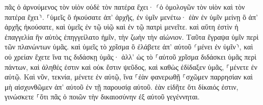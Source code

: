 \documentclass{openreader}
\begin{document}
πᾶς ὁ ἀρνούμενος τὸν υἱὸν οὐδὲ τὸν πατέρα ἔχει· ⸂ὁ ὁμολογῶν τὸν υἱὸν καὶ τὸν πατέρα ἔχει⸃. 
⸀ὑμεῖς ὃ ἠκούσατε ἀπ’ ἀρχῆς, ἐν ὑμῖν μενέτω· ἐὰν ἐν ὑμῖν μείνῃ ὃ ἀπ’ ἀρχῆς ἠκούσατε, καὶ ὑμεῖς ἐν τῷ υἱῷ καὶ ἐν τῷ πατρὶ μενεῖτε. 
καὶ αὕτη ἐστὶν ἡ ἐπαγγελία ἣν αὐτὸς ἐπηγγείλατο ἡμῖν, τὴν ζωὴν τὴν αἰώνιον. 
Ταῦτα ἔγραψα ὑμῖν περὶ τῶν πλανώντων ὑμᾶς. 
καὶ ὑμεῖς τὸ χρῖσμα ὃ ἐλάβετε ἀπ’ αὐτοῦ ⸂μένει ἐν ὑμῖν⸃, καὶ οὐ χρείαν ἔχετε ἵνα τις διδάσκῃ ὑμᾶς· ἀλλ’ ὡς τὸ ⸀αὐτοῦ χρῖσμα διδάσκει ὑμᾶς περὶ πάντων, καὶ ἀληθές ἐστιν καὶ οὐκ ἔστιν ψεῦδος, καὶ καθὼς ἐδίδαξεν ὑμᾶς, ⸀μένετε ἐν αὐτῷ. 
Καὶ νῦν, τεκνία, μένετε ἐν αὐτῷ, ἵνα ⸀ἐὰν φανερωθῇ ⸀σχῶμεν παρρησίαν καὶ μὴ αἰσχυνθῶμεν ἀπ’ αὐτοῦ ἐν τῇ παρουσίᾳ αὐτοῦ. 
ἐὰν εἰδῆτε ὅτι δίκαιός ἐστιν, γινώσκετε ⸀ὅτι πᾶς ὁ ποιῶν τὴν δικαιοσύνην ἐξ αὐτοῦ γεγέννηται. 
\end{document}
